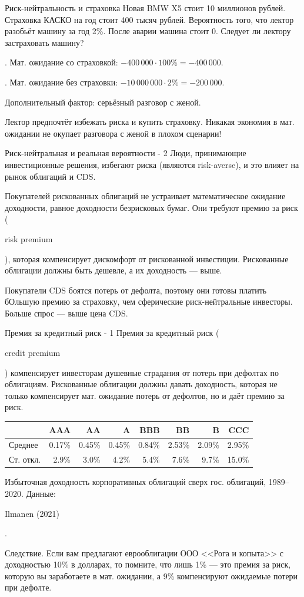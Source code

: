 \documentclass{beamer}
\newcommand{\en}[1]{\begin{otherlanguage}{english}#1\end{otherlanguage}}
\begin{document}
\begin{frame}{Риск-нейтральность и страховка}
\justify
Новая BMW X5 стоит 10 миллионов рублей. Страховка КАСКО на год стоит 400 тысяч рублей. Вероятность того, что лектор разобьёт машину за год 2\%. После аварии машина стоит 0. Следует ли лектору застраховать машину?

. Мат. ожидание со страховкой: $-400\,000 \cdot 100\% = -400\,000$.

. Мат. ожидание без страховки: $-10\,000\,000 \cdot 2\% = -200\,000$.

Дополнительный фактор: серьёзный разговор с женой.

\justify
Лектор предпочтёт избежать риска и купить страховку. Никакая экономия в мат. ожидании не окупает
разговора с женой в плохом сценарии!
\end{frame}



\begin{frame}{Риск-нейтральная и реальная вероятности - 2}
\justify
Люди, принимающие инвестиционные решения, избегают риска (являются risk-averse), и это влияет на рынок облигаций и CDS.

\justify
Покупателей рискованных облигаций не устраивает математическое ожидание доходности, равное доходности безрисковых бумаг. Они требуют \alert{премию за риск} (\en{risk premium}), которая компенсирует дискомфорт от рискованной инвестиции. Рискованные облигации должны быть дешевле, а их доходность --- выше.

\justify
Покупатели CDS боятся потерь от дефолта, поэтому они готовы платить бОльшую премию за страховку, чем сферические риск-нейтральные инвесторы. Больше спрос --- выше цена CDS.
\end{frame}



\begin{frame}{Премия за кредитный риск - 1}
\justify
\alert{Премия за кредитный риск} (\en{credit premium}) компенсирует инвесторам душевные страдания от потерь при дефолтах по облигациям. Рискованные облигации должны
давать доходность, которая не только компенсирует мат. ожидание потерь от
дефолтов, но и даёт премию за риск.

\justify
\centering
{\footnotesize
\begin{tabular}{l|r|r|r|r|r|r|r}
                 & AAA       & AA         & A           & BBB        & BB & B &CCC \\ \hline
Среднее  &  0.17\% & 0.45\%  & 0.45\% & 0.84\% & 2.53\% & 2.09\% & 2.95\%  \\
Ст. откл. & 2.9\%    &3.0\%    & 4.2\%    & 5.4\%   & 7.6\%  & 9.7\%   & 15.0\%
\end{tabular}
}
\justify
\centering
{\scriptsize Избыточная доходность корпоративных облигаций сверх гос. 
облигаций, 1989--2020. Данные: \en{Ilmanen (2021)}.}

\justify
Следствие. Если вам предлагают еврооблигации ООО <<Рога и копыта>> с 
доходностью 10\% в долларах, то помните, что лишь 1\% --- это премия за риск,
которую вы заработаете в мат. ожидании, а 9\% компенсируют ожидаемые
потери при дефолте.
\end{frame}
\end{document}
